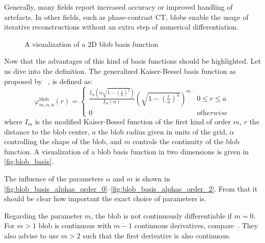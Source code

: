 Generally, many fields report increased accuracy or improved handling of artefacts. In other fields,
such as phase-contrast CT, blobs enable the usage of iterative reconstructions without an extra step
of numerical differentiation.

\begin{figure}
	\caption{A visualization of a \(2\)D blob basis function}\label{fig:blob_basis}
\end{figure}

Now that the advantages of this kind of basis functions should be highlighted. Let us dive into the
definition. The generalized Kaiser-Bessel basis function as proposed by
~\citeauthor{lewitt_multidimensional_1990}, is defined as:
\begin{equation}\label{eq:blob_basis_fn}
	\varphi^{\text{blob}}_{m, \alpha, a}(r) =
	\begin{cases}
		\frac{I_m\left( \alpha \sqrt{1 - \left(\frac{r}{a}\right)^2} \right)} {I_m\left( \alpha \right)} \left( \sqrt{1 - \left(\frac{r}{a}\right)^2}\right)^m & 0 \le r \le a      \\
		0                                                                                                                                                      & \textit{otherwise}
	\end{cases}
\end{equation}
where \(I_m\) is the modified Kaiser-Bessel function of the first kind of order \(m\), \(r\) the
distance to the blob center, \(a\) the blob radius given in units of the grid, \(\alpha\)
controlling the shape of the blob, and \(m\) controls the continuity of the blob function. A
visualization of a blob basis function in two dimensions is given in \autoref{fig:blob_basis}.

The influence of the parameters \(\alpha\) and \(m\) is shown in
\autoref{fig:blob_basis_alphas_order_0}--\autoref{fig:blob_basis_alphas_order_2}. From that it
should be clear how important the exact choice of parameters is.

Regarding the parameter \(m\), the blob is not continuously differentiable if \(m = 0\). For \(m >
1\) blob is continuous with \(m - 1\) continuous derivatives, compare~\cite{matej_practical_1996}.
They also advise to use \(m > 2\) such that the first derivative is also continuous.

